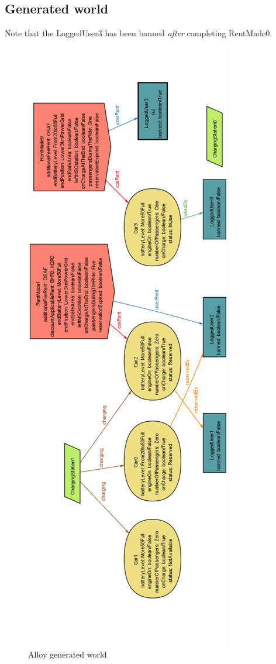 \begin{appendices}
		\subsection{Generated world}
			Note that the LoggedUser3 has been banned \emph{after} completing RentMade0.
			\begin{figure}[h!]
			\centering
			\includegraphics[scale=0.4]{alloy/AlloyWorld2.png}
			\caption{
				\label{fig:alloyWorld1} 
				Alloy generated world
			}
		\end{figure}
		\clearpage

\end{appendices}
